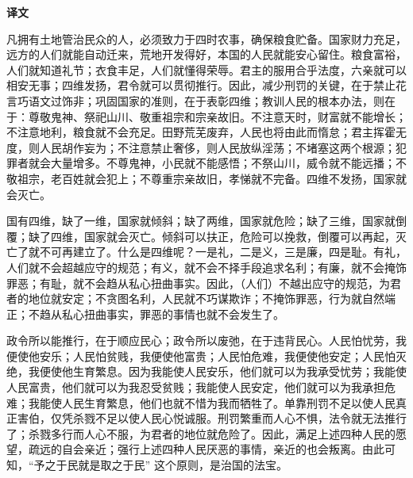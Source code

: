 \documentclass[12pt,UTF-8,openany,a4]{ctexbook}
\begin{document}
\newpage

\begin{Large}
    \noindent\textbf{译文}
\end{Large}


\vspace{1em}

\begin{large}
    \yiwen 
    凡拥有土地管治民众的人，必须致力于四时农事，确保粮食贮备。国家财力充足，远方的人们就能自动迁来，荒地开发得好，本国的人民就能安心留住。粮食富裕，人们就知道礼节；衣食丰足，人们就懂得荣辱。君主的服用合乎法度，六亲就可以相安无事；四维发扬，君令就可以贯彻推行。因此，减少刑罚的关键，在于禁止花言巧语文过饰非；巩固国家的准则，在于表彰四维；教训人民的根本办法，则在于：尊敬鬼神、祭祀山川、敬重祖宗和宗亲故旧。不注意天时，财富就不能增长；不注意地利，粮食就不会充足。田野荒芜废弃，人民也将由此而惰怠；君主挥霍无度，则人民胡作妄为；不注意禁止奢侈，则人民放纵淫荡；不堵塞这两个根源；犯罪者就会大量增多。不尊鬼神，小民就不能感悟；不祭山川，威令就不能远播；不敬祖宗，老百姓就会犯上；不尊重宗亲故旧，孝悌就不完备。四维不发扬，国家就会灭亡。
    
    国有四维，缺了一维，国家就倾斜；缺了两维，国家就危险；缺了三维，国家就倒覆；缺了四维，国家就会灭亡。倾斜可以扶正，危险可以挽救，倒覆可以再起，灭亡了就不可再建立了。什么是四维呢？一是礼，二是义，三是廉，四是耻。有礼，人们就不会超越应守的规范；有义，就不会不择手段追求名利；有廉，就不会掩饰罪恶；有耻，就不会趋从私心扭曲事实。因此，（人们）不越出应守的规范，为君者的地位就安定；不贪图名利，人民就不巧谋欺诈；不掩饰罪恶，行为就自然端正；不趋从私心扭曲事实，罪恶的事情也就不会发生了。
    
    政令所以能推行，在于顺应民心；政令所以废弛，在于违背民心。人民怕忧劳，我便使他安乐；人民怕贫贱，我便使他富贵；人民怕危难，我便使他安定；人民怕灭绝，我便使他生育繁息。因为我能使人民安乐，他们就可以为我承受忧劳；我能使人民富贵，他们就可以为我忍受贫贱；我能使人民安定，他们就可以为我承担危难；我能使人民生育繁息，他们也就不惜为我而牺牲了。单靠刑罚不足以使人民真正害伯，仅凭杀戮不足以使人民心悦诚服。刑罚繁重而人心不惧，法令就无法推行了；杀戮多行而人心不服，为君者的地位就危险了。因此，满足上述四种人民的愿望，疏远的自会亲近；强行上述四种人民厌恶的事情，亲近的也会叛离。由此可知，“予之于民就是取之于民” 这个原则，是治国的法宝。
    

\end{large}
\end{document}
